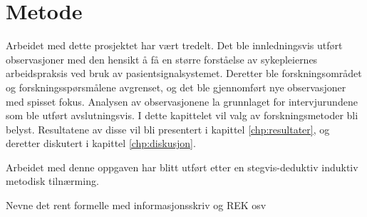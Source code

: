 \chapter{Metode}
\label{chp:metode} 

Arbeidet med dette prosjektet har vært tredelt. Det ble innledningsvis utført observasjoner med den hensikt å få en større forståelse av sykepleiernes arbeidspraksis ved bruk av pasientsignalsystemet. Deretter ble forskningsområdet og forskningsspørsmålene avgrenset, og det ble gjennomført nye observasjoner med spisset fokus. Analysen av observasjonene la grunnlaget for intervjurundene som ble utført avslutningsvis. I dette kapittelet vil valg av forskningsmetoder bli belyst. Resultatene av disse vil bli presentert i kapittel \ref{chp:resultater}, og deretter diskutert i kapittel \ref{chp:diskusjon}.

\noindent
Arbeidet med denne oppgaven har blitt utført etter en stegvis-deduktiv induktiv metodisk tilnærming.


\noindent
Nevne det rent formelle med informasjonsskriv og REK osv
